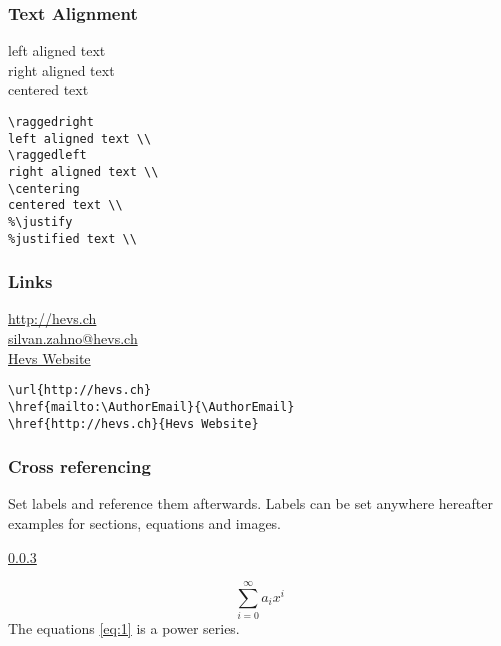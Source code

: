 \documentclass[a4paper,11pt,fleqn]{book}
\makeatletter
\newcommand{\AuthorEmail}{silvan.zahno@hevs.ch}
\makeatother
\begin{document}
\begin{enumerate}
\subsubsection{Text Alignment}
\begin{multicols}{2}
  \raggedright
  left aligned text \\
  \raggedleft
  right aligned text \\
  \centering
  centered text \\

  \vfill\null\columnbreak

  \begin{verbatim}
\raggedright
left aligned text \\
\raggedleft
right aligned text \\
\centering
centered text \\
%\justify
%justified text \\
  \end{verbatim}
\end{multicols}

\subsubsection{Links}
\begin{multicols}{2}
  \url{http://hevs.ch} \\
  \href{mailto:\AuthorEmail}{\AuthorEmail} \\
  \href{http://hevs.ch}{Hevs Website}

  \vfill\null\columnbreak

  \begin{verbatim}
\url{http://hevs.ch}
\href{mailto:\AuthorEmail}{\AuthorEmail}
\href{http://hevs.ch}{Hevs Website}
  \end{verbatim}
\end{multicols}

\subsubsection{Cross referencing} \label{sec:crossref}
Set labels and reference them afterwards. Labels can be set anywhere hereafter examples for sections, equations and images.

\ref{sec:crossref} 

\begin{equation} \label{eq:1}
  \sum_{i=0}^{\infty} a_i x^i
\end{equation}
The equations \ref{eq:1} is a power series.


\end{enumerate}
\end{document}
